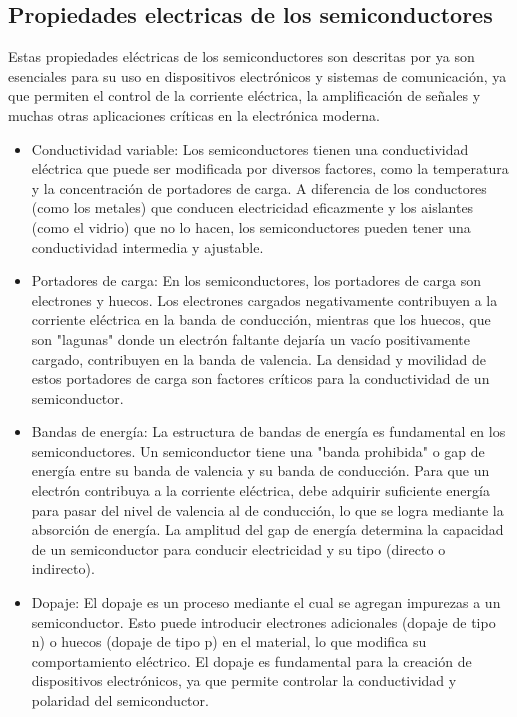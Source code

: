 \documentclass[10.5pt]{article}
\begin{document}
    \subsection{Propiedades electricas de los semiconductores}
    Estas propiedades eléctricas de los semiconductores son descritas por \cite{gurevich} ya son esenciales para su uso en dispositivos electrónicos y sistemas de comunicación, ya que permiten el control de la corriente eléctrica, la amplificación de señales y muchas otras aplicaciones críticas en la electrónica moderna.
    \begin{itemize}
        \item Conductividad variable: Los semiconductores tienen una conductividad eléctrica que puede ser modificada por diversos factores, como la temperatura y la concentración de portadores de carga. A diferencia de los conductores (como los metales) que conducen electricidad eficazmente y los aislantes (como el vidrio) que no lo hacen, los semiconductores pueden tener una conductividad intermedia y ajustable.
        \item Portadores de carga: En los semiconductores, los portadores de carga son electrones y huecos. Los electrones cargados negativamente contribuyen a la corriente eléctrica en la banda de conducción, mientras que los huecos, que son "lagunas" donde un electrón faltante dejaría un vacío positivamente cargado, contribuyen en la banda de valencia. La densidad y movilidad de estos portadores de carga son factores críticos para la conductividad de un semiconductor.
        \item Bandas de energía: La estructura de bandas de energía es fundamental en los semiconductores. Un semiconductor tiene una "banda prohibida" o gap de energía entre su banda de valencia y su banda de conducción. Para que un electrón contribuya a la corriente eléctrica, debe adquirir suficiente energía para pasar del nivel de valencia al de conducción, lo que se logra mediante la absorción de energía. La amplitud del gap de energía determina la capacidad de un semiconductor para conducir electricidad y su tipo (directo o indirecto).
        \item Dopaje: El dopaje es un proceso mediante el cual se agregan impurezas a un semiconductor. Esto puede introducir electrones adicionales (dopaje de tipo n) o huecos (dopaje de tipo p) en el material, lo que modifica su comportamiento eléctrico. El dopaje es fundamental para la creación de dispositivos electrónicos, ya que permite controlar la conductividad y polaridad del semiconductor.

\end{itemize}
\end{document}
